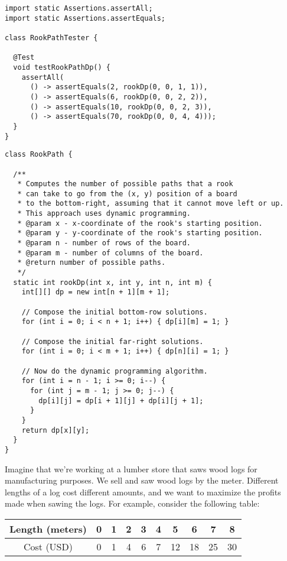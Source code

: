 \begin{lstlisting}[language=MyJava]
import static Assertions.assertAll;
import static Assertions.assertEquals;

class RookPathTester {

  @Test
  void testRookPathDp() {
    assertAll(
      () -> assertEquals(2, rookDp(0, 0, 1, 1)),
      () -> assertEquals(6, rookDp(0, 0, 2, 2)),
      () -> assertEquals(10, rookDp(0, 0, 2, 3)),
      () -> assertEquals(70, rookDp(0, 0, 4, 4)));
  }
}
\end{lstlisting}

\begin{lstlisting}[language=MyJava]
class RookPath {

  /**
   * Computes the number of possible paths that a rook 
   * can take to go from the (x, y) position of a board 
   * to the bottom-right, assuming that it cannot move left or up. 
   * This approach uses dynamic programming.
   * @param x - x-coordinate of the rook's starting position.
   * @param y - y-coordinate of the rook's starting position.
   * @param n - number of rows of the board.
   * @param m - number of columns of the board.
   * @return number of possible paths.
   */
  static int rookDp(int x, int y, int n, int m) {
    int[][] dp = new int[n + 1][m + 1];

    // Compose the initial bottom-row solutions.
    for (int i = 0; i < n + 1; i++) { dp[i][m] = 1; }

    // Compose the initial far-right solutions.
    for (int i = 0; i < m + 1; i++) { dp[n][i] = 1; }

    // Now do the dynamic programming algorithm.
    for (int i = n - 1; i >= 0; i--) {
      for (int j = m - 1; j >= 0; j--) {
        dp[i][j] = dp[i + 1][j] + dp[i][j + 1];
      }
    }
    return dp[x][y];
  }
}
\end{lstlisting}

Imagine that we're working at a lumber store that saws wood logs for manufacturing purposes. 
We sell and saw wood logs by the meter.
Different lengths of a log cost different amounts, and we want to maximize the profits made when sawing the logs. 
For example, consider the following table:

\begin{center}
\begin{tabular}{|c||c|c|c|c|c|c|c|c|c|}
  Length (meters) & 0 & 1 & 2 & 3 & 4 & 5 & 6 & 7 & 8\\
  \hline
  Cost (USD) & 0 & 1 & 4 & 6 & 7 & 12 & 18 & 25 & 30\\
\end{tabular}
\end{center}

